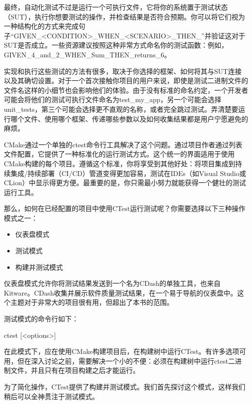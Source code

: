 
最终，自动化测试不过是运行一个可执行文件，它将你的系统置于测试状态（SUT），执行你想要测试的操作，并检查结果是否符合预期。你可以将它们视为一种结构化的方式来完成句子“GIVEN\_<CONDITION>\_WHEN\_<SCENARIO>\_THEN\_<EXPECTED-OUTCOME>”并验证这对于SUT是否成立。一些资源建议按照这种非常方式命名你的测试函数：例如，GIVEN\_4\_and\_2\_WHEN\_Sum\_THEN\_returns\_6。

实现和执行这些测试的方法有很多，取决于你选择的框架、如何将其与SUT连接以及其确切设置。对于一个首次接触你项目的用户来说，即使是测试二进制文件的文件名这样的小细节也会影响他们的体验。由于没有标准的命名约定，一个开发者可能会将他们的测试可执行文件命名为test\_my\_app，另一个可能会选择unit\_tests，第三个可能会选择更不直观的名称，或者完全跳过测试。弄清楚要运行哪个文件、使用哪个框架、传递哪些参数以及如何收集结果都是用户宁愿避免的麻烦。

CMake通过一个单独的ctest命令行工具解决了这个问题。通过项目作者通过列表文件配置，它提供了一种标准化的运行测试方式。这个统一的界面适用于使用CMake构建的每个项目。遵循这个标准，你将享受到其他好处：将项目集成到持续集成/持续部署（CI/CD）管道变得更加容易，测试在IDEs（如Visual Studio或CLion）中显示得更方便。最重要的是，你只需最小努力就能获得一个健壮的测试运行工具。

那么，如何在已经配置的项目中使用CTest运行测试呢？你需要选择以下三种操作模式之一：

\begin{itemize}
\item
仪表盘模式

\item
测试模式

\item
构建并测试模式
\end{itemize}

仪表盘模式允许你将测试结果发送到一个名为CDash的单独工具，也来自Kitware。CDash收集并展示软件质量测试结果，在一个易于导航的仪表盘中。这个主题对于非常大的项目很有用，但超出了本书的范围。

测试模式的命令行如下：

\begin{shell}
ctest [<options>]
\end{shell}

在此模式下，应在使用CMake构建项目后，在构建树中运行CTest。有许多选项可用，但在深入讨论之前，需要解决一个小的不便：必须在构建树中运行ctest二进制文件，并且只有在项目构建之后才能运行。

为了简化操作，CTest提供了构建并测试模式。我们首先探讨这个模式，这样我们稍后可以全神贯注于测试模式。

